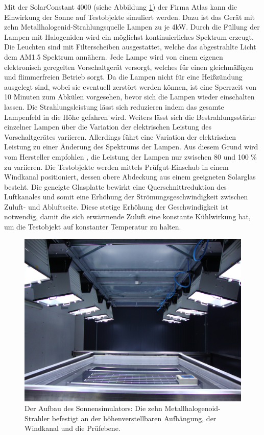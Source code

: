 \documentclass[a4paper,bibtotoc,oneside]{scrbook}
\begin{document}
Mit der SolarConstant 4000 (siehe Abbildung \ref{sunsim}) der Firma Atlas kann die Einwirkung der Sonne auf Testobjekte simuliert werden. Dazu ist das Gerät mit zehn Metallhalogenid-Strahlungsquelle Lampen zu je 4kW. Durch die Füllung der Lampen mit Halogeniden wird ein möglichst kontinuierliches Spektrum erzeugt. Die Leuchten sind mit Filterscheiben ausgestattet, welche das abgestrahlte Licht dem AM1.5 Spektrum annähern.
Jede Lampe wird von einem eigenen elektronisch geregelten Vorschaltgerät versorgt, welches für einen gleichmäßigen und flimmerfreien Betrieb sorgt.
Da die Lampen nicht für eine Heißzündung ausgelegt sind, wobei sie eventuell zerstört werden können, ist eine Sperrzeit von 10 Minuten zum Abkülen vorgesehen, bevor sich die Lampen wieder einschalten lassen.
Die Strahlungsleistung lässt sich reduzieren indem das gesamte Lampenfeld in die Höhe gefahren wird.
Weiters lässt sich die Bestrahlungsstärke einzelner Lampen über die Variation der elektrischen Leistung des Vorschaltgerätes variieren.
Allerdings führt eine Variation der elektrischen Leistung zu einer Änderung des Spektrums der Lampen. Aus diesem Grund wird vom Hersteller empfohlen \cite{atlas}, die Leistung der Lampen nur zwischen 80 und 100 \% zu variieren.
Die Testobjekte werden mittels Prüfgut-Einschub in einem Windkanal positioniert, dessen obere Abdeckung aus einem geeigneten Solarglas besteht. Die geneigte Glasplatte bewirkt eine Querschnittreduktion des Luftkanales und somit eine Erhöhung der Strömungsgeschwindigkeit zwischen Zuluft- und Abluftseite. Diese stetige Erhöhung der Geschwindigkeit ist notwendig, damit die sich erwärmende Zuluft eine konstante Kühlwirkung hat, um die Testobjekt auf konstanter Temperatur zu halten.


\begin{figure}[htbp]
\centering
\includegraphics[width=125mm]{img/sunsimulator.jpg}
\caption[Sonnensimulator]{Der Aufbau des Sonnensimulators: Die zehn Metallhalogenoid-Strahler befestigt an der höhenverstellbaren Aufhängung, der Windkanal und die Prüfebene.}\label{sunsim}
\end{figure}
\end{document}
